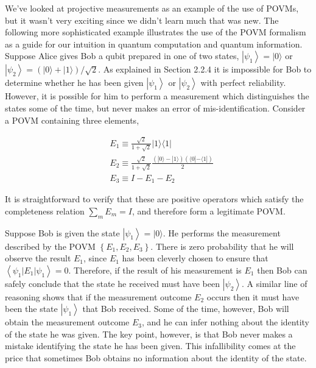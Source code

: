 \documentclass[10pt]{article}
\begin{document}
We've looked at projective measurements as an example of the use of POVMs, but it wasn't very exciting since we didn't learn much that was new. The following more sophisticated example illustrates the use of the POVM formalism as a guide for our intuition in quantum computation and quantum information. Suppose Alice gives Bob a qubit prepared in one of two states, $\left|\psi_{1}\right\rangle=|0\rangle$ or $\left|\psi_{2}\right\rangle=(|0\rangle+|1\rangle) / \sqrt{2}$. As explained in Section 2.2.4 it is impossible for Bob to determine whether he has been given $\left|\psi_{1}\right\rangle$ or $\left|\psi_{2}\right\rangle$ with perfect reliability. However, it is possible for him to perform a measurement which distinguishes the states some of the time, but never makes an error of mis-identification. Consider a POVM containing three elements,


\begin{align*}
& E_{1} \equiv \frac{\sqrt{2}}{1+\sqrt{2}}|1\rangle\langle 1|  \tag{2.118}\\
& E_{2} \equiv \frac{\sqrt{2}}{1+\sqrt{2}} \frac{(|0\rangle-|1\rangle)(\langle 0|-\langle 1|)}{2}  \tag{2.119}\\
& E_{3} \equiv I-E_{1}-E_{2} \tag{2.120}
\end{align*}


It is straightforward to verify that these are positive operators which satisfy the completeness relation $\sum_{m} E_{m}=I$, and therefore form a legitimate POVM.

Suppose Bob is given the state $\left|\psi_{1}\right\rangle=|0\rangle$. He performs the measurement described by the POVM $\left\{E_{1}, E_{2}, E_{3}\right\}$. There is zero probability that he will observe the result $E_{1}$, since $E_{1}$ has been cleverly chosen to ensure that $\left\langle\psi_{1}\left|E_{1}\right| \psi_{1}\right\rangle=0$. Therefore, if the result of his measurement is $E_{1}$ then Bob can safely conclude that the state he received must have been $\left|\psi_{2}\right\rangle$. A similar line of reasoning shows that if the measurement outcome $E_{2}$ occurs then it must have been the state $\left|\psi_{1}\right\rangle$ that Bob received. Some of the time, however, Bob will obtain the measurement outcome $E_{3}$, and he can infer nothing about the identity of the state he was given. The key point, however, is that Bob never makes a mistake identifying the state he has been given. This infallibility comes at the price that sometimes Bob obtains no information about the identity of the state.
\end{document}
